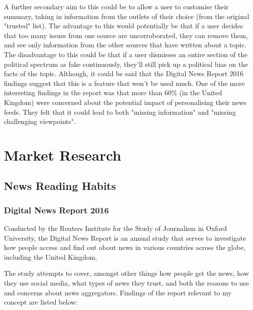 \documentclass[12pt]{article}
\begin{document}
A further secondary aim to this could be to allow a user to customise their summary, taking in information from the outlets of their choice (from the original "trusted" list). The advantage to this would potentially be that if a user decides that too many issues from one source are uncorroborated, they can remove them, and see only information from the other sources that have written about a topic. The disadvantage to this could be that if a user dismisses an entire section of the political spectrum as fake continuously, they'll still pick up a political bias on the facts of the topic. Although, it could be said that the Digital News Report 2016 findings suggest that this is a feature that won't be used much. One of the more interesting findings in the report was that more than 60\% (in the United Kingdom) were concerned about the potential impact of personalising their news feeds. They felt that it could lead to both "missing information" and "missing challenging viewpoints". 


\pagebreak

\section{Market Research}

\subsection{News Reading Habits}

\subsubsection{Digital News Report 2016}

\label{DigitalNewsReport}

Conducted by the Reuters Institute for the Study of Journalism\cite{reutersInstitute} in Oxford University\cite{oxford}, the Digital News Report\cite{digitalNewsReport} is an annual study that serves to investigate how people access and find out about news in various countries across the globe, including the United Kingdom.

The study attempts to cover, amongst other things how people get the news, how they use social media, what types of news they trust, and both the reasons to use and concerns about news aggregators. Findings of the report relevant to my concept are listed below:
\end{document}
